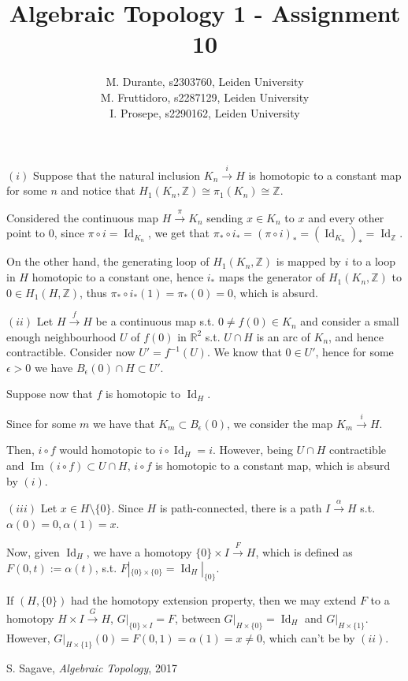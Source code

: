 \documentclass{article}
\newcommand{\numberset}{\mathbb}
\newcommand{\Z}{\numberset{Z}}
\newcommand{\R}{\numberset{R}}
\newcommand{\I}{\mathbb{I}}
\DeclareMathOperator{\Id}{Id}
\DeclareMathOperator{\Ima}{Im}
\newcommand{\exercise}[1]{\noindent {\bf Exercise #1}}
\begin{document}
\title{Algebraic Topology 1 - Assignment 10}

\author{M. Durante, s2303760, Leiden University\\M. Fruttidoro, s2287129, Leiden University\\I. Prosepe, s2290162, Leiden University}

\maketitle


\exercise{11.4}

$(i)$ Suppose that the natural inclusion $K_n\xrightarrow{i} H$ is homotopic to a constant map for some $n$ and notice that $H_1(K_n,\Z)\cong\pi_1(K_n)\cong\Z$.

Considered the continuous map $H\xrightarrow{\pi} K_n$ sending $x\in K_n$ to $x$ and every other point to 0, since $\pi\circ i=\Id_{K_n}$, we get that $\pi_*\circ i_*=(\pi\circ i)_*=(\Id_{K_n})_*=\Id_{\Z}$.

On the other hand, the generating loop of $H_1(K_n,\Z)$ is mapped by $i$ to a loop in $H$ homotopic to a constant one, hence $i_*$ maps the generator of $H_1(K_n,\Z)$ to $0\in H_1(H,\Z)$, thus $\pi_*\circ i_*(1)=\pi_*(0)=0$, which is absurd.

$(ii)$ Let $H\xrightarrow{f} H$ be a continuous map s.t. $0\neq f(0)\in K_n$ and consider a small enough neighbourhood $U$ of $f(0)$ in $\R^2$ s.t. $U\cap H$ is an arc of $K_n$, and hence contractible. Consider now $U'=f^{-1}(U)$. We know that $0\in U'$, hence for some $\epsilon>0$ we have $B_{\epsilon}(0)\cap H\subset U'$.

Suppose now that $f$ is homotopic to $\Id_H$.

Since for some $m$ we have that $K_m\subset B_{\epsilon}(0)$, we consider the map $K_m\xrightarrow{i} H$.

Then, $i\circ f$ would homotopic to $i\circ\Id_{H}=i$. However, being $U\cap H$ contractible and $\Ima(i\circ f)\subset U\cap H$, $i\circ f$ is homotopic to a constant map, which is absurd by $(i)$.

$(iii)$ Let $x\in H\setminus\{0\}$. Since $H$ is path-connected, there is a path $I\xrightarrow{\alpha} H$ s.t. $\alpha(0)=0,\alpha(1)=x$.

Now, given $\Id_H$, we have a homotopy $\{0\}\times I\xrightarrow{F} H$, which is defined as $F(0,t):=\alpha(t)$, s.t. $F|_{\{0\}\times\{0\}}=\Id_H|_{\{0\}}$.

If $(H,\{0\})$ had the homotopy extension property, then we may extend $F$ to a homotopy $H\times I\xrightarrow{G} H$, $G|_{\{0\}\times I}=F$, between $G|_{H\times\{0\}}=\Id_H$ and $G|_{H\times\{1\}}$. However, $G|_{H\times\{1\}}(0)=F(0,1)=\alpha(1)=x\neq 0$, which can't be by $(ii)$.


\begin{thebibliography}{9}
    S. Sagave,
    \textit{Algebraic Topology},
    2017
\end{thebibliography}
\end{document}

